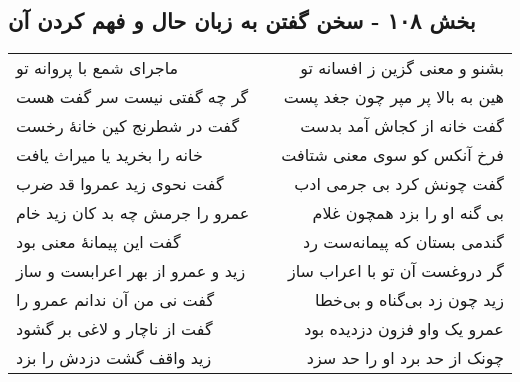 \begin{center}
\section*{بخش ۱۰۸ - سخن گفتن به زبان حال و فهم کردن آن}
\label{sec:sh108}
\begin{longtable}{l p{0.5cm} r}
ماجرای شمع با پروانه تو
&&
بشنو و معنی گزین ز افسانه تو
\\
گر چه گفتی نیست سر گفت هست
&&
هین به بالا پر مپر چون جغد پست
\\
گفت در شطرنج کین خانهٔ رخست
&&
گفت خانه از کجاش آمد بدست
\\
خانه را بخرید یا میراث یافت
&&
فرخ آنکس کو سوی معنی شتافت
\\
گفت نحوی زید عمروا قد ضرب
&&
گفت چونش کرد بی جرمی ادب
\\
عمرو را جرمش چه بد کان زید خام
&&
بی گنه او را بزد همچون غلام
\\
گفت این پیمانهٔ معنی بود
&&
گندمی بستان که پیمانه‌ست رد
\\
زید و عمرو از بهر اعرابست و ساز
&&
گر دروغست آن تو با اعراب ساز
\\
گفت نی من آن ندانم عمرو را
&&
زید چون زد بی‌گناه و بی‌خطا
\\
گفت از ناچار و لاغی بر گشود
&&
عمرو یک واو فزون دزدیده بود
\\
زید واقف گشت دزدش را بزد
&&
چونک از حد برد او را حد سزد
\\
\end{longtable}
\end{center}
